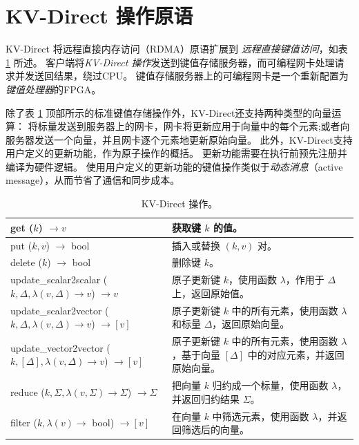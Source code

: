 \section{KV-Direct 操作原语}
\label{kvdirect:sec:architecture}
\label{kvdirect:sec:kv-operations}

KV-Direct 将远程直接内存访问（RDMA）原语扩展到 \textit {远程直接键值访问}，如表 \ref {kvdirect:tab:kv-operations} 所述。
客户端将\textit {KV-Direct 操作}发送到键值存储服务器，而可编程网卡处理请求并发送回结果，绕过CPU。
键值存储服务器上的可编程网卡是一个重新配置为\textit {键值处理器}的FPGA。

除了表 \ref {kvdirect:tab:kv-operations} 顶部所示的标准键值存储操作外，KV-Direct还支持两种类型的向量运算：
将标量发送到服务器上的网卡，网卡将更新应用于向量中的每个元素;或者向服务器发送一个向量，并且网卡逐个元素地更新原始向量。
此外，KV-Direct支持用户定义的更新功能，作为原子操作的概括。
更新功能需要在执行前预先注册并编译为硬件逻辑。
使用用户定义的更新功能的键值操作类似于\textit {动态消息}（active message）\cite {eicken1992active}，从而节省了通信和同步成本。


\begin{table}
\centering
\caption{KV-Direct 操作。}
\label{kvdirect:tab:kv-operations}
\small
\begin{tabular}{p{}|p{} }
\toprule
get ($k$) $\rightarrow v$ & 获取键 $k$ 的值。 \\
\midrule
put ($k, v$) $\rightarrow$ bool & 插入或替换 $(k, v)$ 对。 \\
\midrule
delete ($k$) $\rightarrow$ bool & 删除键 $k$。 \\
\midrule
\midrule
update{\_}scalar2scalar ($k, \Delta, \lambda(v, \Delta) \rightarrow v$) $\rightarrow v$ & 原子更新键 $k$，使用函数 $\lambda$，作用于 $\Delta$ 上，返回原始值。\\
\midrule
update{\_}scalar2vector ($k, \Delta, \lambda(v, \Delta) \rightarrow v$) $\rightarrow [v]$ & 原子更新键 $k$ 中的所有元素，使用函数 $\lambda$ 和标量 $\Delta$，返回原始向量。 \\
\midrule
update{\_}vector2vector ($k, [\Delta], \lambda(v, \Delta) \rightarrow v$) $\rightarrow [v]$ & 原子更新键 $k$ 中的所有元素，使用函数 $\lambda$，基于向量 $[\Delta]$ 中的对应元素，并返回原始向量。 \\
\midrule
reduce ($k, \Sigma, \lambda(v, \Sigma) \rightarrow \Sigma$) $\rightarrow \Sigma$ & 把向量 $k$ 归约成一个标量，使用函数 $\lambda$，并返回归约结果 $\Sigma$。 \\
\midrule
filter ($k, \lambda(v) \rightarrow$ bool) $\rightarrow [v]$ & 在向量 $k$ 中筛选元素，使用函数 $\lambda$，并返回筛选后的向量。 \\
\bottomrule
\end{tabular}
\end{table}

